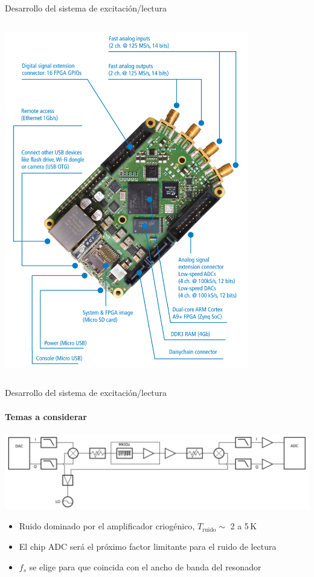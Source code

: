 \documentclass[ignorenonframetext,12pt]{beamer}
\begin{document}
\begin{frame}{Desarrollo del sistema de excitación/lectura}
\begin{columns}
\begin{column}{0.5\textwidth}
												\includegraphics[width=0.8\textwidth]{rp_sistema_2}
								\end{column}
				\end{columns}
\end{frame}

\begin{frame}{Desarrollo del sistema de excitación/lectura}
				\framesubtitle{Temas a considerar}
				\centering
				\includegraphics[width=\textwidth]{readout1}

				\begin{itemize}
								\item Ruido \alert{dominado por el amplificador criogénico},
												$T_\text{ruido} \sim$ 2 a 5\,K 
								\item \alert{El chip ADC será el próximo factor
												limitante para el ruido de lectura}
								\item	$f_s$ se elige para que
												coincida con el ancho de banda del resonador
				\end{itemize}

\end{frame}
\end{document}
